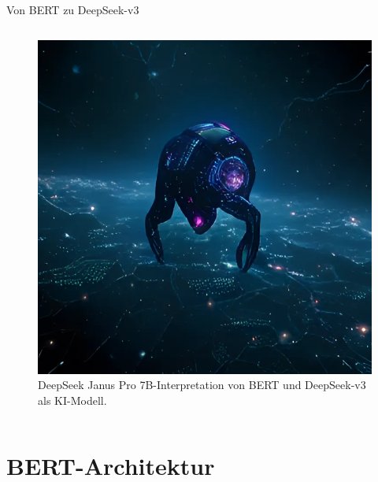 \documentclass[aspectratio=1610, xcolor=dvipsnames, 9pt]{beamer}
\begin{document}
\begin{frame}{Von BERT zu DeepSeek-v3}
\begin{columns}
\begin{column}{0.5\textwidth}
\begin{figure}
      \end{figure}
      \begin{figure}
        \centering
        \includegraphics[height=0.35\textheight]{images/deepseek_selfimage.png}
        \caption{DeepSeek Janus Pro 7B-Interpretation von BERT und DeepSeek-v3 als KI-Modell.}
      \end{figure}
    \end{column}
  \end{columns}
\end{frame}

\section{BERT-Architektur}
\end{document}
